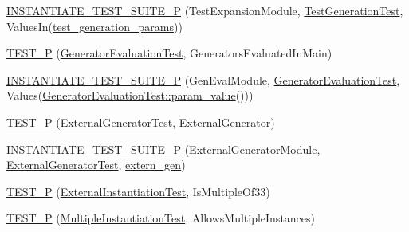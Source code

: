 \begin{DoxyCompactItemize}
\item 
\mbox{\hyperlink{googletest-master_2googletest_2test_2googletest-param-test-test_8cc_a9cc091d291c71bfd813289cc81f09789}{I\+N\+S\+T\+A\+N\+T\+I\+A\+T\+E\+\_\+\+T\+E\+S\+T\+\_\+\+S\+U\+I\+T\+E\+\_\+P}} (Test\+Expansion\+Module, \mbox{\hyperlink{class_test_generation_test}{Test\+Generation\+Test}}, Values\+In(\mbox{\hyperlink{_obj__test_2lib_2googletest-release-1_88_81_2googletest_2test_2googletest-param-test-test_8cc_aefe5c7eafc17e71cec010d92628bf84f}{test\+\_\+generation\+\_\+params}}))
\item 
\mbox{\hyperlink{googletest-master_2googletest_2test_2googletest-param-test-test_8cc_afb359adcaa80d8d4de1a139e16ddbbcd}{T\+E\+S\+T\+\_\+P}} (\mbox{\hyperlink{class_generator_evaluation_test}{Generator\+Evaluation\+Test}}, Generators\+Evaluated\+In\+Main)
\item 
\mbox{\hyperlink{googletest-master_2googletest_2test_2googletest-param-test-test_8cc_a272666f64d14841aa6bf7efd2eec2541}{I\+N\+S\+T\+A\+N\+T\+I\+A\+T\+E\+\_\+\+T\+E\+S\+T\+\_\+\+S\+U\+I\+T\+E\+\_\+P}} (Gen\+Eval\+Module, \mbox{\hyperlink{class_generator_evaluation_test}{Generator\+Evaluation\+Test}}, Values(\mbox{\hyperlink{class_generator_evaluation_test_ac819769e32b738677401424deb3c8cbe}{Generator\+Evaluation\+Test\+::param\+\_\+value}}()))
\item 
\mbox{\hyperlink{googletest-master_2googletest_2test_2googletest-param-test-test_8cc_a83249caca89bdaafc2b8b167ffe9e684}{T\+E\+S\+T\+\_\+P}} (\mbox{\hyperlink{class_external_generator_test}{External\+Generator\+Test}}, External\+Generator)
\item 
\mbox{\hyperlink{googletest-master_2googletest_2test_2googletest-param-test-test_8cc_ae0474a45b8b9ae1be2776ec9f015b41c}{I\+N\+S\+T\+A\+N\+T\+I\+A\+T\+E\+\_\+\+T\+E\+S\+T\+\_\+\+S\+U\+I\+T\+E\+\_\+P}} (External\+Generator\+Module, \mbox{\hyperlink{class_external_generator_test}{External\+Generator\+Test}}, \mbox{\hyperlink{_obj__test_2lib_2googletest-release-1_88_81_2googletest_2test_2googletest-param-test2-test_8cc_a0f691f1461778d71f30b1fb1dea1cb50}{extern\+\_\+gen}})
\item 
\mbox{\hyperlink{googletest-master_2googletest_2test_2googletest-param-test-test_8cc_aaa93e4bed0890e2fdf1d7ae232315753}{T\+E\+S\+T\+\_\+P}} (\mbox{\hyperlink{class_external_instantiation_test}{External\+Instantiation\+Test}}, Is\+Multiple\+Of33)
\item 
\mbox{\hyperlink{googletest-master_2googletest_2test_2googletest-param-test-test_8cc_ad1bbb42b9a1b3bf455ee0dcb4f8c4fb2}{T\+E\+S\+T\+\_\+P}} (\mbox{\hyperlink{class_multiple_instantiation_test}{Multiple\+Instantiation\+Test}}, Allows\+Multiple\+Instances)

\end{DoxyCompactItemize}
